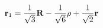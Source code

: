 \begin{equation}                      
{\bf r}_{1} = \frac{1}{\sqrt{3}} {\bf R} - \frac{1}{\sqrt{6}} {\bf \rho}                      
+ \frac{1}{\sqrt{2}} {\bf r}                      
\end{equation} 
